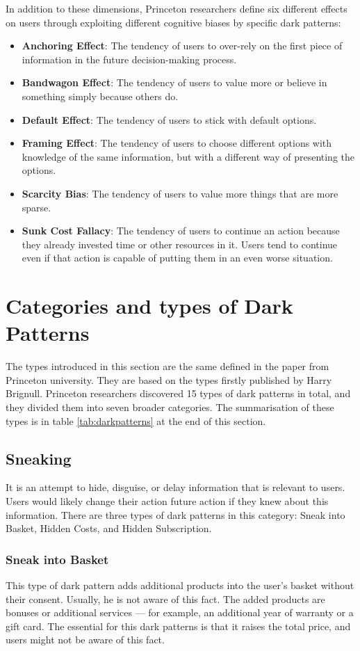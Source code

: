 In addition to these dimensions, Princeton researchers define six different effects on users through exploiting different cognitive biases by specific dark patterns:

\begin{itemize}
    \item \textbf{Anchoring Effect}: The tendency of users to over-rely on the first piece of information in the future decision-making process.
    \item \textbf{Bandwagon Effect}: The tendency of users to value more or believe in something simply because others do.
    \item \textbf{Default Effect}: The tendency of users to stick with default options.
    \item \textbf{Framing Effect}: The tendency of users to choose different options with knowledge of the same information, but with a different way of presenting the options.
    \item \textbf{Scarcity Bias}: The tendency of users to value more things that are more sparse.
    \item \textbf{Sunk Cost Fallacy}: The tendency of users to continue an action because they already invested time or other resources in it. Users tend to continue even if that action is capable of putting them in an even worse situation.
\end{itemize}

\section{Categories and types of Dark Patterns}
The types introduced in this section are the same defined in the paper from Princeton university\cite{dark-patterns-at-scale}. They are based on the types firstly published by Harry Brignull\cite{dark-patterns-brignull}.
Princeton researchers discovered 15 types of dark patterns in total, and they divided them into seven broader categories. The summarisation of these types is in table \ref{tab:darkpatterns} at the end of this section.
    \subsection{Sneaking}
    It is an attempt to hide, disguise, or delay information that is relevant to users. Users would likely change their action future action if they knew about this information. There are three types of dark patterns in this category: Sneak into Basket, Hidden Costs, and Hidden Subscription.
        \subsubsection{Sneak into Basket}
        This type of dark pattern adds additional products into the user's basket without their consent. Usually, he is not aware of this fact. The added products are bonuses or additional services — for example, an additional year of warranty or a gift card. The essential for this dark patterns is that it raises the total price, and users might not be aware of this fact. 
        
